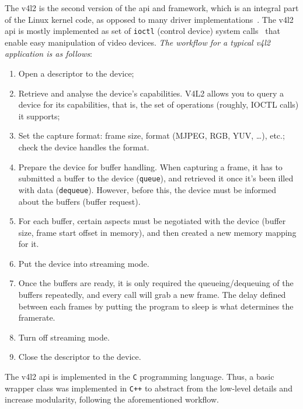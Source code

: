 The \gls{v4l2} is the second version of the \gls{api} and framework, which is an
integral part of the Linux kernel code, as opposed to many driver
implementations~\cite{v4l2-headers}. The \gls{v4l2} \gls{api} is mostly
implemented as set of \texttt{ioctl} (control device) system
calls~\cite{kerrisk2010linux} that enable easy manipulation of video devices.
\emph{The workflow for a typical \gls{v4l2} application is as follows}:
\begin{enumerate}
\item Open a descriptor to the device;
\item Retrieve and analyse the device's capabilities. V4L2 allows you to query a
  device for its capabilities, that is, the set of operations (roughly, IOCTL
  calls) it supports;
\item Set the capture format: frame size, format (MJPEG, RGB, YUV, \ldots),
  etc.; check the device handles the format.
\item Prepare the device for buffer handling. When capturing a frame, it has
  to submitted a buffer to the device (\texttt{queue}), and retrieved it once
  it's been illed with data (\texttt{dequeue}). However, before this, the device
  must be informed about the buffers (buffer request).
\item For each buffer, certain aspects must be negotiated with
  the device (buffer size, frame start offset in memory), and then created a new
  memory mapping for it.
\item Put the device into streaming mode.
\item Once the buffers are ready, it is only required the queueing/dequeuing
  of the buffers repeatedly, and every call will grab a new frame. The delay
  defined between each frames by putting the program to sleep is what
  determines the framerate.
\item Turn off streaming mode.
\item Close the descriptor to the device.
\end{enumerate}

The \gls{v4l2} \gls{api} is implemented in the \texttt{C} programming
language. Thus, a basic wrapper class was implemented in \texttt{C++} to
abstract from the low-level details and increase modularity, following the
aforementioned workflow.

